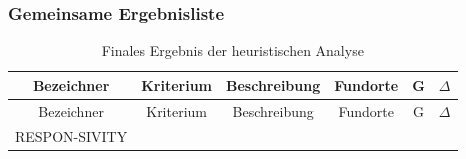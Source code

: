 \documentclass[
  12pt,
  ngerman,
  a4paper,
]{article}
\begin{document}
\hypertarget{gemeinsame-ergebnisliste}{%
\subsubsection{Gemeinsame
Ergebnisliste}\label{gemeinsame-ergebnisliste}}

\begin{longtable}[]{@{}cccccc@{}}
\caption{Finales Ergebnis der heuristischen Analyse
\label{tbl:heur:final}}\tabularnewline
\toprule
\begin{minipage}[b]{0.10\columnwidth}\centering
Bezeichner\strut
\end{minipage} & \begin{minipage}[b]{0.11\columnwidth}\centering
Kriterium\strut
\end{minipage} & \begin{minipage}[b]{0.29\columnwidth}\centering
Beschreibung\strut
\end{minipage} & \begin{minipage}[b]{0.28\columnwidth}\centering
Fundorte\strut
\end{minipage} & \begin{minipage}[b]{0.02\columnwidth}\centering
G\strut
\end{minipage} & \begin{minipage}[b]{0.04\columnwidth}\centering
\(\Delta\)\strut
\end{minipage}\tabularnewline
\midrule
\endfirsthead
\toprule
\begin{minipage}[b]{0.10\columnwidth}\centering
Bezeichner\strut
\end{minipage} & \begin{minipage}[b]{0.11\columnwidth}\centering
Kriterium\strut
\end{minipage} & \begin{minipage}[b]{0.29\columnwidth}\centering
Beschreibung\strut
\end{minipage} & \begin{minipage}[b]{0.28\columnwidth}\centering
Fundorte\strut
\end{minipage} & \begin{minipage}[b]{0.02\columnwidth}\centering
G\strut
\end{minipage} & \begin{minipage}[b]{0.04\columnwidth}\centering
\(\Delta\)\strut
\end{minipage}\tabularnewline
\midrule
\endhead
\begin{minipage}[t]{0.10\columnwidth}\centering
RESPON-SIVITY\strut
\end{minipage} & \begin{minipage}[t]{0.11\columnwidth}\centering

\end{minipage}
\end{longtable}
\end{document}
